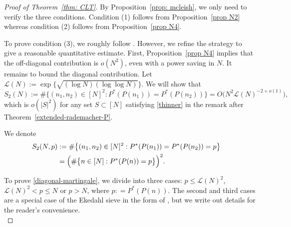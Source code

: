 \documentclass[reqno, 12pt]{amsart}
\theoremstyle{plain}
\theoremstyle{definition}
\theoremstyle{remark}
\newcommand{\LL}{\mathcal L}
\renewcommand{\le}{\leqslant}
\renewcommand{\geq}{\geqslant}
\begin{document}
\begin{proof}[Proof of Theorem~\ref{thm: CLT}]
    By Proposition~\ref{prop: mcleish}, we only need to verify the three conditions. Condition (1) follows from Proposition~\ref{prop N2} whereas condition (2) follows from Proposition~\ref{prop N4}. 





    To prove condition (3), we roughly follow \cite{KSX23}.
    However, we refine the strategy to give a reasonable quantitative estimate.
    First, Proposition~\ref{prop N4} implies that the off-diagonal contribution is $o(N^{2})$, even with a power saving in $N$.
It remains to bound the diagonal contribution.
Let $\LL(N):=\exp\{ \sqrt{(\log N)(\log\log N)}\}.$
We will show that
\begin{equation}
\label{diagonal-martingale}
S_2(N):=\# \big\{ (  n_1, n_2) \in [N]^{2}:  P^{*}(P(n_1)) = P^{*}(P(n_2))\big\}
= O\big(N^2\LL (N)^{-2+o(1)}\big),
\end{equation}
which is $o(|S|^2)$ for any set $S\subset [N]$ satisfying \eqref{thinner}
in the remark after Theorem~\ref{extended-rademacher-P}.



We denote
\begin{align*}
S_2(N,p)&:=\# \big\{ (  n_1, n_2) \in [N]^{2}:  P^{*}(P(n_1)) = P^{*}(P(n_2))=p\big\}
\cr&
=\Big(\# \big\{ n \in [N] :  P^{*}(P(n )) = p\big\}\Big)^2 .    
\end{align*}

To prove \eqref{diagonal-martingale}, we divide into three cases: $p \le  \LL(N)^2$, $ \LL(N)^2 < p \le N $ or $p> N$, where $p: = P^{*}(P(n))$. The second and third cases are a special case of the Ekedahl sieve
in the form of \cite[Theorem 3.3]{BhargavaEkedahl},
but we write out details for the reader's convenience. \\


\end{proof}
\end{document}
